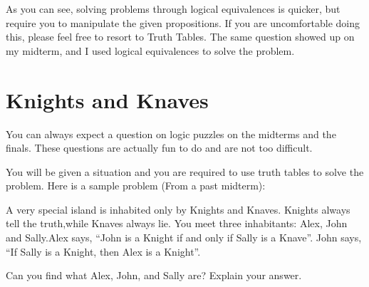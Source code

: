 \begin{remark}
    As you can see, solving problems through logical equivalences is quicker,
    but require you to manipulate the given propositions. If you are
    uncomfortable doing this, please feel free to resort to Truth Tables. The
    same question showed up on my midterm, and I used logical equivalences to
    solve the problem.
\end{remark}

\section{Knights and Knaves}
You can always expect a question on logic puzzles on the midterms and the
finals. These questions are actually fun to do and are not too difficult.

You will be given a situation and you are required to use truth tables to solve
the problem. Here is a sample problem (From a past midterm):

A very special island is inhabited only by Knights and Knaves. Knights always
tell the truth,while Knaves always lie. You meet three inhabitants: Alex, John
and Sally.Alex says, “John is a Knight if and only if Sally is a Knave”. John
says, “If Sally is a Knight, then Alex is a Knight”.

\begin{question}
    Can you find what Alex, John, and Sally are? Explain your answer.
\end{question}

